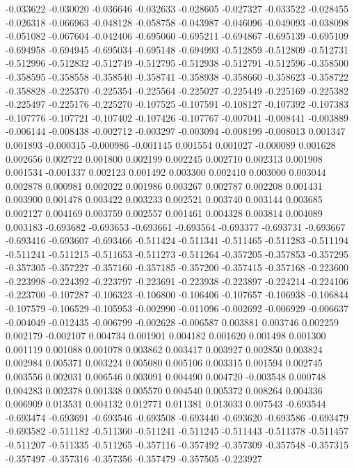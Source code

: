 -0.033622
-0.030020
-0.036646
-0.032633
-0.028605
-0.027327
-0.033522
-0.028455
-0.026318
-0.066963
-0.048128
-0.058758
-0.043987
-0.046096
-0.049093
-0.038098
-0.051082
-0.067604
-0.042406
-0.695060
-0.695211
-0.694867
-0.695139
-0.695109
-0.694958
-0.694945
-0.695034
-0.695148
-0.694993
-0.512859
-0.512809
-0.512731
-0.512996
-0.512832
-0.512749
-0.512795
-0.512938
-0.512791
-0.512596
-0.358500
-0.358595
-0.358558
-0.358540
-0.358741
-0.358938
-0.358660
-0.358623
-0.358722
-0.358828
-0.225370
-0.225354
-0.225564
-0.225027
-0.225449
-0.225169
-0.225382
-0.225497
-0.225176
-0.225270
-0.107525
-0.107591
-0.108127
-0.107392
-0.107383
-0.107776
-0.107721
-0.107402
-0.107426
-0.107767
-0.007041
-0.008441
-0.003889
-0.006144
-0.008438
-0.002712
-0.003297
-0.003094
-0.008199
-0.008013
0.001347
0.001893
-0.000315
-0.000986
-0.001145
0.001554
0.001027
-0.000089
0.001628
0.002656
0.002722
0.001800
0.002199
0.002245
0.002710
0.002313
0.001908
0.001534
-0.001337
0.002123
0.001492
0.003300
0.002410
0.003000
0.003044
0.002878
0.000981
0.002022
0.001986
0.003267
0.002787
0.002208
0.001431
0.003900
0.001478
0.003422
0.003233
0.002521
0.003740
0.003144
0.003685
0.002127
0.004169
0.003759
0.002557
0.001461
0.004328
0.003814
0.004089
0.003183
-0.693682
-0.693653
-0.693661
-0.693564
-0.693377
-0.693731
-0.693667
-0.693416
-0.693607
-0.693466
-0.511424
-0.511341
-0.511465
-0.511283
-0.511194
-0.511241
-0.511215
-0.511653
-0.511273
-0.511264
-0.357205
-0.357853
-0.357295
-0.357305
-0.357227
-0.357160
-0.357185
-0.357200
-0.357415
-0.357168
-0.223600
-0.223998
-0.224392
-0.223797
-0.223691
-0.223938
-0.223897
-0.224214
-0.224106
-0.223700
-0.107287
-0.106323
-0.106800
-0.106406
-0.107657
-0.106938
-0.106844
-0.107579
-0.106529
-0.105953
-0.002990
-0.011096
-0.002692
-0.006929
-0.006637
-0.004049
-0.012435
-0.006799
-0.002628
-0.006587
0.003881
0.003746
0.002259
0.002179
-0.002107
0.004734
0.001901
0.004182
0.001620
0.001498
0.001300
0.001119
0.001088
0.001078
0.003862
0.003417
0.003927
0.002850
0.003824
0.002984
0.005371
0.003224
0.005080
0.005106
0.003315
0.001594
0.002745
0.003556
0.002031
0.006546
0.003091
0.004490
0.004720
-0.003548
0.000748
0.004283
0.002378
0.001338
0.005570
0.004540
0.005372
0.008264
0.004336
0.006909
0.013531
0.004132
0.012771
0.011381
0.013033
0.007543
-0.693544
-0.693474
-0.693691
-0.693546
-0.693508
-0.693440
-0.693620
-0.693586
-0.693479
-0.693582
-0.511182
-0.511360
-0.511241
-0.511245
-0.511443
-0.511378
-0.511457
-0.511207
-0.511335
-0.511265
-0.357116
-0.357492
-0.357309
-0.357548
-0.357315
-0.357497
-0.357316
-0.357356
-0.357479
-0.357505
-0.223927
